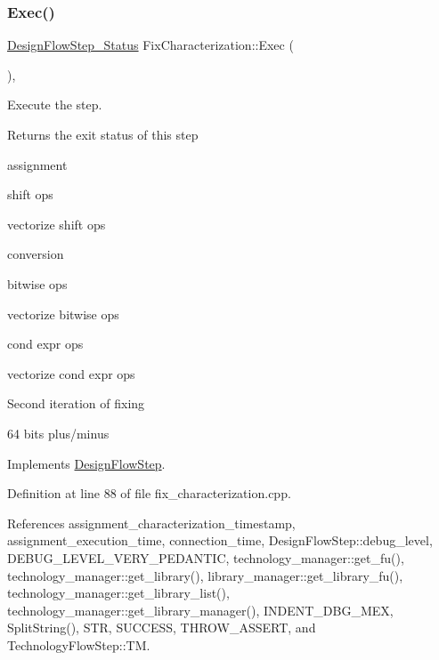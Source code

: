 \mbox{\label{classFixCharacterization_a45c45b820d574101ae07841c5f773b6c}} 
\subsubsection{\texorpdfstring{Exec()}{Exec()}}
{\footnotesize\ttfamily \hyperlink{design__flow__step_8hpp_afb1f0d73069c26076b8d31dbc8ebecdf}{Design\+Flow\+Step\+\_\+\+Status} Fix\+Characterization\+::\+Exec (\begin{DoxyParamCaption}{ }\end{DoxyParamCaption})\hspace{0.3cm}{\ttfamily [override]}, {\ttfamily [virtual]}}



Execute the step. 

\begin{DoxyReturn}{Returns}
the exit status of this step 
\end{DoxyReturn}
assignment

shift ops

vectorize shift ops

conversion

bitwise ops

vectorize bitwise ops

cond expr ops

vectorize cond expr ops

Second iteration of fixing

64 bits plus/minus 

Implements \hyperlink{classDesignFlowStep_a77d7e38493016766098711ea24f60b89}{Design\+Flow\+Step}.



Definition at line 88 of file fix\+\_\+characterization.\+cpp.



References assignment\+\_\+characterization\+\_\+timestamp, assignment\+\_\+execution\+\_\+time, connection\+\_\+time, Design\+Flow\+Step\+::debug\+\_\+level, D\+E\+B\+U\+G\+\_\+\+L\+E\+V\+E\+L\+\_\+\+V\+E\+R\+Y\+\_\+\+P\+E\+D\+A\+N\+T\+IC, technology\+\_\+manager\+::get\+\_\+fu(), technology\+\_\+manager\+::get\+\_\+library(), library\+\_\+manager\+::get\+\_\+library\+\_\+fu(), technology\+\_\+manager\+::get\+\_\+library\+\_\+list(), technology\+\_\+manager\+::get\+\_\+library\+\_\+manager(), I\+N\+D\+E\+N\+T\+\_\+\+D\+B\+G\+\_\+\+M\+EX, Split\+String(), S\+TR, S\+U\+C\+C\+E\+SS, T\+H\+R\+O\+W\+\_\+\+A\+S\+S\+E\+RT, and Technology\+Flow\+Step\+::\+TM.

